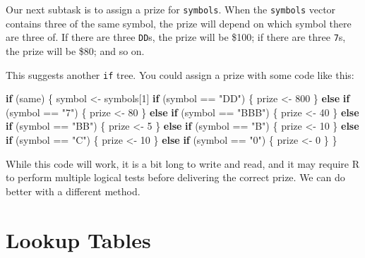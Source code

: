 \documentclass[
  letterpaper,
  DIV=11,
  numbers=noendperiod]{scrbook}
\newenvironment{Shaded}{\begin{snugshade}}{\end{snugshade}}
\newcommand{\ControlFlowTok}[1]{\textcolor[rgb]{0.00,0.23,0.31}{\textbf{#1}}}
\newcommand{\DecValTok}[1]{\textcolor[rgb]{0.68,0.00,0.00}{#1}}
\newcommand{\NormalTok}[1]{\textcolor[rgb]{0.00,0.23,0.31}{#1}}
\newcommand{\OtherTok}[1]{\textcolor[rgb]{0.00,0.23,0.31}{#1}}
\newcommand{\SpecialCharTok}[1]{\textcolor[rgb]{0.37,0.37,0.37}{#1}}
\newcommand{\StringTok}[1]{\textcolor[rgb]{0.13,0.47,0.30}{#1}}
\begin{document}
Our next subtask is to assign a prize for \texttt{symbols}. When the
\texttt{symbols} vector contains three of the same symbol, the prize
will depend on which symbol there are three of. If there are three
\texttt{DD}s, the prize will be \$100; if there are three \texttt{7}s,
the prize will be \$80; and so on.

This suggests another \texttt{if} tree. You could assign a prize with
some code like this:

\begin{Shaded}
\begin{Highlighting}[]
\ControlFlowTok{if}\NormalTok{ (same) \{}
\NormalTok{  symbol }\OtherTok{\textless{}{-}}\NormalTok{ symbols[}\DecValTok{1}\NormalTok{]}
  \ControlFlowTok{if}\NormalTok{ (symbol }\SpecialCharTok{==} \StringTok{"DD"}\NormalTok{) \{}
\NormalTok{    prize }\OtherTok{\textless{}{-}} \DecValTok{800}
\NormalTok{  \} }\ControlFlowTok{else} \ControlFlowTok{if}\NormalTok{ (symbol }\SpecialCharTok{==} \StringTok{"7"}\NormalTok{) \{}
\NormalTok{    prize }\OtherTok{\textless{}{-}} \DecValTok{80}
\NormalTok{  \} }\ControlFlowTok{else} \ControlFlowTok{if}\NormalTok{ (symbol }\SpecialCharTok{==} \StringTok{"BBB"}\NormalTok{) \{}
\NormalTok{    prize }\OtherTok{\textless{}{-}} \DecValTok{40}
\NormalTok{  \} }\ControlFlowTok{else} \ControlFlowTok{if}\NormalTok{ (symbol }\SpecialCharTok{==} \StringTok{"BB"}\NormalTok{) \{}
\NormalTok{    prize }\OtherTok{\textless{}{-}} \DecValTok{5}
\NormalTok{  \} }\ControlFlowTok{else} \ControlFlowTok{if}\NormalTok{ (symbol }\SpecialCharTok{==} \StringTok{"B"}\NormalTok{) \{}
\NormalTok{    prize }\OtherTok{\textless{}{-}} \DecValTok{10}
\NormalTok{  \} }\ControlFlowTok{else} \ControlFlowTok{if}\NormalTok{ (symbol }\SpecialCharTok{==} \StringTok{"C"}\NormalTok{) \{}
\NormalTok{    prize }\OtherTok{\textless{}{-}} \DecValTok{10}
\NormalTok{  \} }\ControlFlowTok{else} \ControlFlowTok{if}\NormalTok{ (symbol }\SpecialCharTok{==} \StringTok{"0"}\NormalTok{) \{}
\NormalTok{    prize }\OtherTok{\textless{}{-}} \DecValTok{0}
\NormalTok{  \}}
\NormalTok{\}}
\end{Highlighting}
\end{Shaded}

While this code will work, it is a bit long to write and read, and it
may require R to perform multiple logical tests before delivering the
correct prize. We can do better with a different method.

\section{Lookup Tables}\label{lookup-tables}
\end{document}
